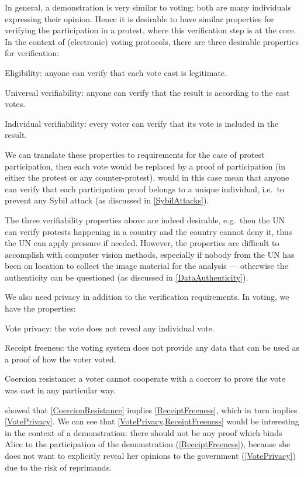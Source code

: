 In general, a demonstration is very similar to voting: both are many 
individuals expressing their opinion.
Hence it is desirable to have similar properties for verifying the 
participation in a protest, where this verification step is at the core.
In the context of (electronic) voting protocols, there are three desirable 
properties for verification:
\begin{requirements}[V]
\item\label{EligibilityVerif} Eligibility: anyone can verify that each vote 
  cast is legitimate.
\item\label{UniversalVerif} Universal verifiability: anyone can verify that the 
  result is according to the cast votes.
\item\label{IndividualVerif} Individual verifiability: every voter can verify 
  that its vote is included in the result.
\end{requirements}
We can translate these properties to requirements for the case of protest 
participation, then each vote would be replaced by a proof of participation (in 
either the protest or any counter-protest).
 would in this case mean that anyone can verify that 
each participation proof belongs to a unique individual, i.e.\ to prevent any 
Sybil attack (as discussed in \cref{SybilAttacks}).

The three verifiability properties above are indeed desirable, e.g.\ then the 
\ac{UN} can verify protests happening in a country and the country cannot deny 
it, thus the \ac{UN} can apply pressure if needed.
However, the properties are difficult to accomplish with computer vision 
methods, especially if nobody from the \ac{UN} has been on location to collect 
the image material for the analysis --- otherwise the authenticity can be 
questioned (as discussed in \cref{DataAuthenticity}).

We also need privacy in addition to the verification requirements.
In voting, we have the properties:
\begin{requirements}[P]
\item\label{VotePrivacy} Vote privacy: the vote does not reveal any individual 
  vote.
\item\label{ReceiptFreeness} Receipt freeness: the voting system does not 
  provide any data that can be used as a proof of how the voter voted.
\item\label{CoercionResistance} Coercion resistance: a voter cannot cooperate 
  with a coercer to prove the vote was cast in any particular way.
\end{requirements}
\Textcite{VerifyingPrivacyPropertiesOfVotingProtocols} showed that 
\cref{CoercionResistance} implies \cref{ReceiptFreeness}, which in turn implies
\cref{VotePrivacy}.
We can see that \cref{VotePrivacy,ReceiptFreeness} would be interesting in the 
context of a demonstration: there should not be any proof which binds Alice to 
the participation of the demonstration (\cref{ReceiptFreeness}), because she 
does not want to explicitly reveal her opinions to the government 
(\cref{VotePrivacy}) due to the risk of reprimands.

